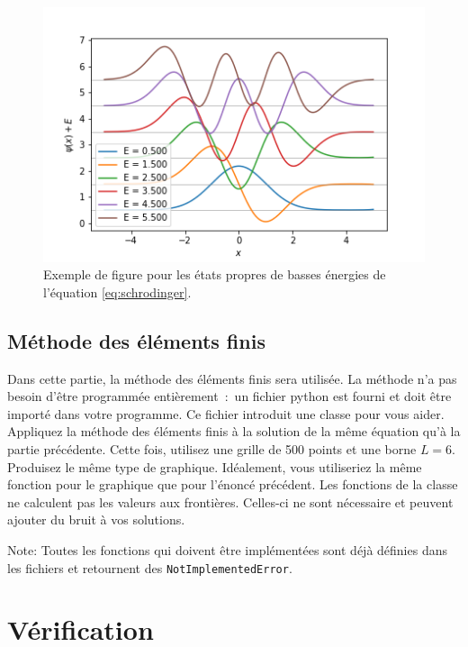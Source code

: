 \documentclass[12pt, letterpaper]{article}
\begin{document}
\begin{figure}[h!!]
    \centering
    \includegraphics[scale=0.5]{../images/exemple}
    \caption{Exemple de figure pour les états propres de basses énergies
    de l'équation \ref{eq:schrodinger}.}
    \label{fig:exemple}
\end{figure}

\subsection{Méthode des éléments finis}\label{subsec:methode-des-elements-finis}

\noindent Dans cette partie, la méthode des éléments finis sera utilisée.
La méthode n’a pas besoin d’être programmée entièrement~:~un fichier python est fourni
et doit être importé dans votre programme.
Ce fichier introduit une classe pour vous aider.
Appliquez la méthode des éléments finis à la solution de la même équation qu’à la partie précédente.
Cette fois, utilisez une grille de 500 points et une borne $L = 6$.
Produisez le même type de graphique.
Idéalement, vous utiliseriez la même fonction pour le graphique que pour l'énoncé précédent.
Les fonctions de la classe ne calculent pas les valeurs aux frontières.
Celles-ci ne sont nécessaire et peuvent ajouter du bruit à vos solutions.

\bigskip

\noindent Note: Toutes les fonctions qui doivent être implémentées sont déjà définies dans les fichiers
et retournent des \texttt{NotImplementedError}.


\section{Vérification}\label{sec:verification}
\end{document}
